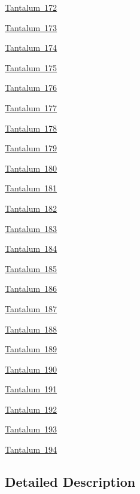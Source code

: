 \begin{DoxyCompactItemize}
\mbox{\hyperlink{group___isotope_const-_tantalum-_ta172}{Tantalum 172}}
\item 
\mbox{\hyperlink{group___isotope_const-_tantalum-_ta173}{Tantalum 173}}
\item 
\mbox{\hyperlink{group___isotope_const-_tantalum-_ta174}{Tantalum 174}}
\item 
\mbox{\hyperlink{group___isotope_const-_tantalum-_ta175}{Tantalum 175}}
\item 
\mbox{\hyperlink{group___isotope_const-_tantalum-_ta176}{Tantalum 176}}
\item 
\mbox{\hyperlink{group___isotope_const-_tantalum-_ta177}{Tantalum 177}}
\item 
\mbox{\hyperlink{group___isotope_const-_tantalum-_ta178}{Tantalum 178}}
\item 
\mbox{\hyperlink{group___isotope_const-_tantalum-_ta179}{Tantalum 179}}
\item 
\mbox{\hyperlink{group___isotope_const-_tantalum-_ta180}{Tantalum 180}}
\item 
\mbox{\hyperlink{group___isotope_const-_tantalum-_ta181}{Tantalum 181}}
\item 
\mbox{\hyperlink{group___isotope_const-_tantalum-_ta182}{Tantalum 182}}
\item 
\mbox{\hyperlink{group___isotope_const-_tantalum-_ta183}{Tantalum 183}}
\item 
\mbox{\hyperlink{group___isotope_const-_tantalum-_ta184}{Tantalum 184}}
\item 
\mbox{\hyperlink{group___isotope_const-_tantalum-_ta185}{Tantalum 185}}
\item 
\mbox{\hyperlink{group___isotope_const-_tantalum-_ta186}{Tantalum 186}}
\item 
\mbox{\hyperlink{group___isotope_const-_tantalum-_ta187}{Tantalum 187}}
\item 
\mbox{\hyperlink{group___isotope_const-_tantalum-_ta188}{Tantalum 188}}
\item 
\mbox{\hyperlink{group___isotope_const-_tantalum-_ta189}{Tantalum 189}}
\item 
\mbox{\hyperlink{group___isotope_const-_tantalum-_ta190}{Tantalum 190}}
\item 
\mbox{\hyperlink{group___isotope_const-_tantalum-_ta191}{Tantalum 191}}
\item 
\mbox{\hyperlink{group___isotope_const-_tantalum-_ta192}{Tantalum 192}}
\item 
\mbox{\hyperlink{group___isotope_const-_tantalum-_ta193}{Tantalum 193}}
\item 
\mbox{\hyperlink{group___isotope_const-_tantalum-_ta194}{Tantalum 194}}
\end{DoxyCompactItemize}


\subsection{Detailed Description}
